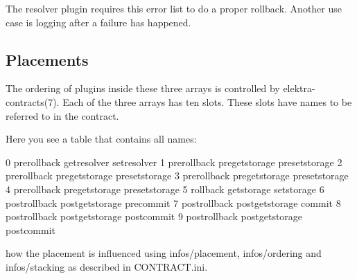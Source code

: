 The resolver plugin requires this error list to do a proper rollback. Another use case is logging after a failure has happened.

\subsection*{Placements}

The ordering of plugins inside these three arrays is controlled by elektra-\/contracts(7). Each of the three arrays has ten slots. These slots have names to be referred to in the contract.

Here you see a table that contains all names\+: \begin{DoxyVerb}    0     prerollback       getresolver         setresolver  
    1     prerollback       pregetstorage      presetstorage 
    2     prerollback       pregetstorage      presetstorage 
    3     prerollback       pregetstorage      presetstorage 
    4     prerollback       pregetstorage      presetstorage 
    5      rollback            getstorage         setstorage 
    6    postrollback      postgetstorage      precommit     
    7    postrollback      postgetstorage         commit     
    8    postrollback      postgetstorage     postcommit     
    9    postrollback      postgetstorage     postcommit     
\end{DoxyVerb}


how the placement is influenced using infos/placement, infos/ordering and infos/stacking as described in C\+O\+N\+T\+R\+A\+C\+T.ini. 
